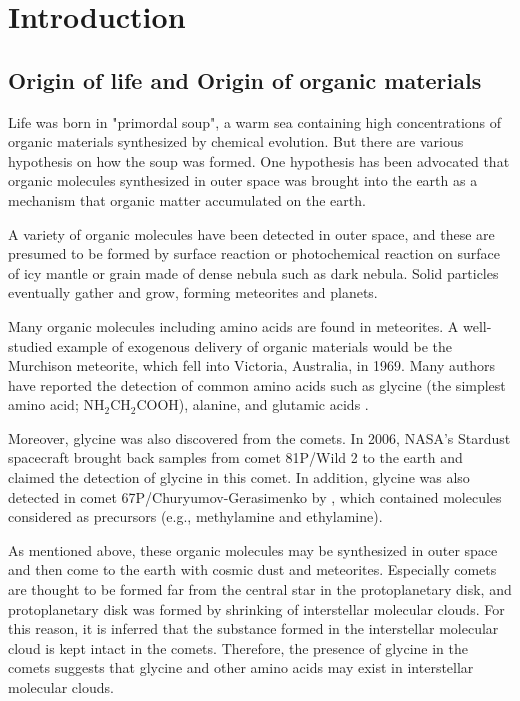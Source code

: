 \chapter{Introduction
  \label{chap:introduction}}


\section{Origin of life and Origin of organic materials}
Life was born in "primordal soup", a warm sea containing high concentrations of organic materials synthesized by chemical evolution. But there are various hypothesis on how the soup was formed.
One hypothesis has been advocated that organic molecules synthesized in outer space 
was brought into the earth as a mechanism that organic matter accumulated on the earth.

A variety of organic molecules have been detected in outer space, and these are presumed 
to be formed by surface reaction or photochemical reaction on surface of icy mantle or grain 
made of dense nebula such as dark nebula.
Solid particles eventually gather and grow, forming meteorites and planets.

Many organic molecules including amino acids are found in meteorites.
A well-studied example of exogenous delivery of organic materials would
be the Murchison meteorite, which fell into Victoria, Australia, in 1969. 
Many authors have reported the detection of common amino acids such as glycine 
(the simplest amino acid; NH$_2$CH$_2$COOH), alanine, and glutamic acids \citep[e.g., ][]{Engel+Nagy1982}.

Moreover, glycine was also discovered from the comets. 
In 2006, NASA's Stardust spacecraft brought back samples from comet 81P/Wild 2 to the earth 
and \citet{Elsila+2009} claimed the detection of glycine in this comet.
In addition, glycine was also detected in comet 67P/Churyumov-Gerasimenko by \citet{Altwegg+2016},
which contained molecules considered as precursors (e.g., methylamine and ethylamine).

As mentioned above, these organic molecules may be synthesized in outer space and then 
come to the earth with cosmic dust and meteorites.
Especially comets are thought to be formed far from the central star in the protoplanetary disk, 
and protoplanetary disk was formed by shrinking of interstellar molecular clouds. 
For this reason, it is inferred that the substance formed in the interstellar molecular cloud 
is kept intact in the comets.
Therefore, the presence of glycine in the comets suggests that glycine and other amino acids 
may exist in interstellar molecular clouds.

